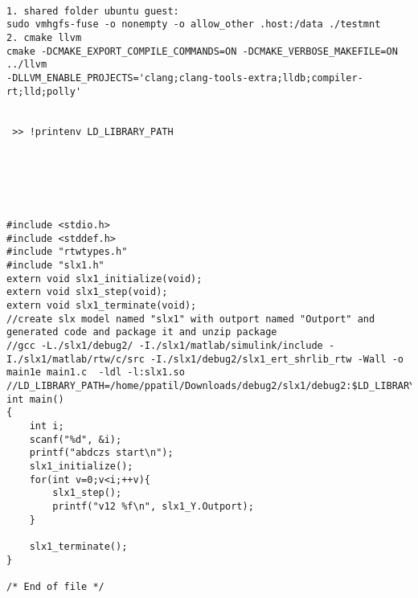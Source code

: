\begin{verbatim}

1. shared folder ubuntu guest: 
sudo vmhgfs-fuse -o nonempty -o allow_other .host:/data ./testmnt
2. cmake llvm
cmake -DCMAKE_EXPORT_COMPILE_COMMANDS=ON -DCMAKE_VERBOSE_MAKEFILE=ON ../llvm
-DLLVM_ENABLE_PROJECTS='clang;clang-tools-extra;lldb;compiler-rt;lld;polly'


 >> !printenv LD_LIBRARY_PATH






#include <stdio.h>
#include <stddef.h>
#include "rtwtypes.h"
#include "slx1.h"
extern void slx1_initialize(void);
extern void slx1_step(void);
extern void slx1_terminate(void);
//create slx model named "slx1" with outport named "Outport" and generated code and package it and unzip package
//gcc -L./slx1/debug2/ -I./slx1/matlab/simulink/include -I./slx1/matlab/rtw/c/src -I./slx1/debug2/slx1_ert_shrlib_rtw -Wall -o main1e main1.c  -ldl -l:slx1.so
//LD_LIBRARY_PATH=/home/ppatil/Downloads/debug2/slx1/debug2:$LD_LIBRARY_PATH
int main()
{   
    int i;
    scanf("%d", &i);
    printf("abdczs start\n");
    slx1_initialize();
    for(int v=0;v<i;++v){
        slx1_step();
        printf("v12 %f\n", slx1_Y.Outport);
    }
    
    slx1_terminate();
}

/* End of file */


\end{verbatim}

